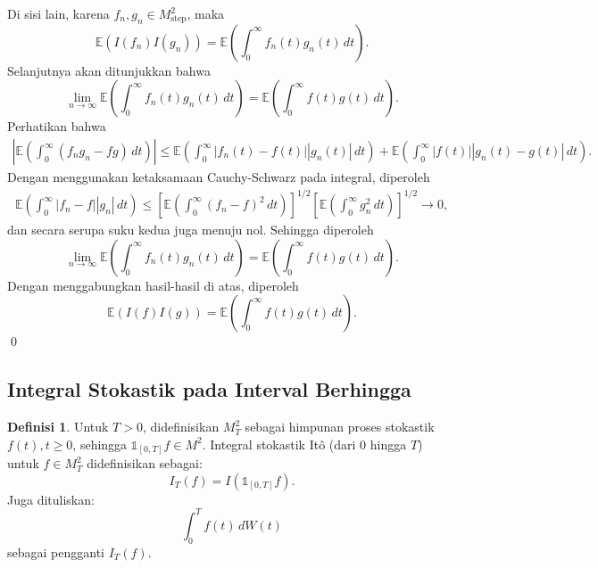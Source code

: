 \documentclass[aspectratio=169,11pt]{beamer}
\theoremstyle{definition}
\newtheorem{definisi}{Definisi}
\begin{document}
\begin{frame}[allowframebreaks]{\insertsection}{\insertsubsection}
  Di sisi lain, karena $f_n, g_n \in M_{\text{step}}^2$, maka
  \begin{equation*}
    \mathbb{E}(I(f_n)I(g_n)) = \mathbb{E}\left(\int_0^\infty f_n(t)g_n(t) \, dt\right).
  \end{equation*}
  Selanjutnya akan ditunjukkan bahwa
  \begin{equation*}
    \lim_{n \to \infty} \mathbb{E}\left(\int_0^\infty f_n(t)g_n(t) \, dt\right) = \mathbb{E}\left(\int_0^\infty f(t)g(t) \, dt\right).
  \end{equation*}
  Perhatikan bahwa
  \begin{align*}
    \left|\mathbb{E}\left(\int_0^\infty (f_n g_n - fg) \, dt\right)\right| \leq \mathbb{E}\left(\int_0^\infty |f_n(t) - f(t)||g_n(t)| \, dt\right) + \mathbb{E}\left(\int_0^\infty |f(t)||g_n(t) - g(t)| \, dt\right).
  \end{align*}
  Dengan menggunakan ketaksamaan Cauchy-Schwarz pada integral, diperoleh
  \begin{align*}
    \mathbb{E}\left(\int_0^\infty |f_n - f||g_n| \, dt\right) \leq \left[\mathbb{E}\left(\int_0^\infty (f_n - f)^2 \, dt\right)\right]^{1/2} \left[\mathbb{E}\left(\int_0^\infty g_n^2 \, dt\right)\right]^{1/2} \to 0,
  \end{align*}
  dan secara serupa suku kedua juga menuju nol. Sehingga diperoleh
  \begin{equation*}
    \lim_{n \to \infty} \mathbb{E}\left(\int_0^\infty f_n(t)g_n(t) \, dt\right) = \mathbb{E}\left(\int_0^\infty f(t)g(t) \, dt\right).
  \end{equation*}
  Dengan menggabungkan hasil-hasil di atas, diperoleh
  \begin{equation*}
    \mathbb{E}(I(f)I(g)) = \mathbb{E}\left(\int_0^\infty f(t)g(t) \, dt\right).
  \end{equation*} \qed
\end{frame}

\subsection{Integral Stokastik pada Interval Berhingga}
\begin{frame}{\insertsection}{\insertsubsection}
  \begin{definisi}
    Untuk $T > 0$, didefinisikan $M_T^2$ sebagai himpunan proses stokastik $f(t), t \geq 0$, sehingga $\mathds{1}_{[0,T]} f \in M^2$. Integral stokastik Itô (dari $0$ hingga $T$) untuk $f \in M_T^2$ didefinisikan sebagai:
    \begin{equation*}
      I_T(f) = I(\mathds{1}_{[0,T]} f).
    \end{equation*}
    Juga dituliskan:
    \begin{equation*}
      \int_0^T f(t) \, dW(t)
    \end{equation*}
    sebagai pengganti $I_T(f)$.
  \end{definisi}
\end{frame}
\end{document}
